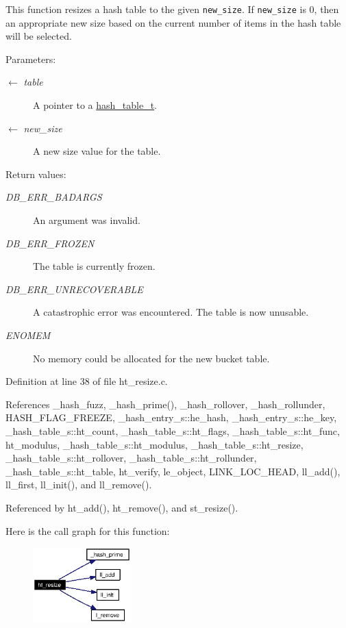 This function resizes a hash table to the given {\tt new\_\-size}. If {\tt new\_\-size} is 0, then an appropriate new size based on the current number of items in the hash table will be selected.

\begin{Desc}
\item[Parameters:]
\begin{description}
\item[\mbox{$\leftarrow$} {\em table}]A pointer to a \hyperlink{group__dbprim__hash_ga1}{hash\_\-table\_\-t}. \item[\mbox{$\leftarrow$} {\em new\_\-size}]A new size value for the table.\end{description}
\end{Desc}
\begin{Desc}
\item[Return values:]
\begin{description}
\item[{\em DB\_\-ERR\_\-BADARGS}]An argument was invalid. \item[{\em DB\_\-ERR\_\-FROZEN}]The table is currently frozen. \item[{\em DB\_\-ERR\_\-UNRECOVERABLE}]A catastrophic error was encountered. The table is now unusable. \item[{\em ENOMEM}]No memory could be allocated for the new bucket table.\end{description}
\end{Desc}


Definition at line 38 of file ht\_\-resize.c.

References \_\-hash\_\-fuzz, \_\-hash\_\-prime(), \_\-hash\_\-rollover, \_\-hash\_\-rollunder, HASH\_\-FLAG\_\-FREEZE, \_\-hash\_\-entry\_\-s::he\_\-hash, \_\-hash\_\-entry\_\-s::he\_\-key, \_\-hash\_\-table\_\-s::ht\_\-count, \_\-hash\_\-table\_\-s::ht\_\-flags, \_\-hash\_\-table\_\-s::ht\_\-func, ht\_\-modulus, \_\-hash\_\-table\_\-s::ht\_\-modulus, \_\-hash\_\-table\_\-s::ht\_\-resize, \_\-hash\_\-table\_\-s::ht\_\-rollover, \_\-hash\_\-table\_\-s::ht\_\-rollunder, \_\-hash\_\-table\_\-s::ht\_\-table, ht\_\-verify, le\_\-object, LINK\_\-LOC\_\-HEAD, ll\_\-add(), ll\_\-first, ll\_\-init(), and ll\_\-remove().

Referenced by ht\_\-add(), ht\_\-remove(), and st\_\-resize().

Here is the call graph for this function:\begin{figure}[H]
\begin{center}
\leavevmode
\includegraphics[width=107pt]{group__dbprim__hash_ga17_cgraph}
\end{center}
\end{figure}


